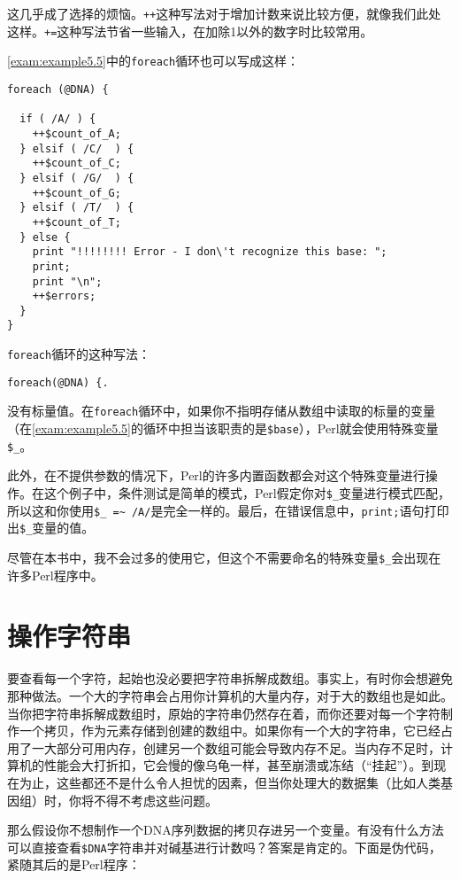 这几乎成了选择的烦恼。\verb|++|这种写法对于增加计数来说比较方便，就像我们此处这样。\verb|+=|这种写法节省一些输入，在加除1以外的数字时比较常用。

\autoref{exam:example5.5}中的\verb|foreach|循环也可以写成这样：

\begin{lstlisting}
foreach (@DNA) {
  
  if ( /A/ ) {
    ++$count_of_A;
  } elsif ( /C/  ) {
    ++$count_of_C;
  } elsif ( /G/  ) {
    ++$count_of_G;
  } elsif ( /T/  ) {
    ++$count_of_T;
  } else {
    print "!!!!!!!! Error - I don\'t recognize this base: ";
    print;
    print "\n";
    ++$errors;
  }
}
\end{lstlisting}

\verb|foreach|循环的这种写法：

\begin{lstlisting}
foreach(@DNA) {.
\end{lstlisting}

没有标量值。在\verb|foreach|循环中，如果你不指明存储从数组中读取的标量的变量（在\autoref{exam:example5.5}的循环中担当该职责的是\verb|$base|），Perl就会使用特殊变量\verb|$_|。

此外，在不提供参数的情况下，Perl的许多内置函数都会对这个特殊变量进行操作。在这个例子中，条件测试是简单的模式，Perl假定你对\verb|$_|变量进行模式匹配，所以这和你使用\verb|$_ =~ /A/|是完全一样的。最后，在错误信息中，\verb|print;|语句打印出\verb|$_|变量的值。 

尽管在本书中，我不会过多的使用它，但这个不需要命名的特殊变量\verb|$_|会出现在许多Perl程序中。

\section{操作字符串}
要查看每一个字符，起始也没必要把字符串拆解成数组。事实上，有时你会想避免那种做法。一个大的字符串会占用你计算机的大量内存，对于大的数组也是如此。当你把字符串拆解成数组时，原始的字符串仍然存在着，而你还要对每一个字符制作一个拷贝，作为元素存储到创建的数组中。如果你有一个大的字符串，它已经占用了一大部分可用内存，创建另一个数组可能会导致内存不足。当内存不足时，计算机的性能会大打折扣，它会慢的像乌龟一样，甚至崩溃或冻结（“挂起”）。到现在为止，这些都还不是什么令人担忧的因素，但当你处理大的数据集（比如人类基因组）时，你将不得不考虑这些问题。

那么假设你不想制作一个DNA序列数据的拷贝存进另一个变量。有没有什么方法可以直接查看\verb|$DNA|字符串并对碱基进行计数吗？答案是肯定的。下面是伪代码，紧随其后的是Perl程序：

